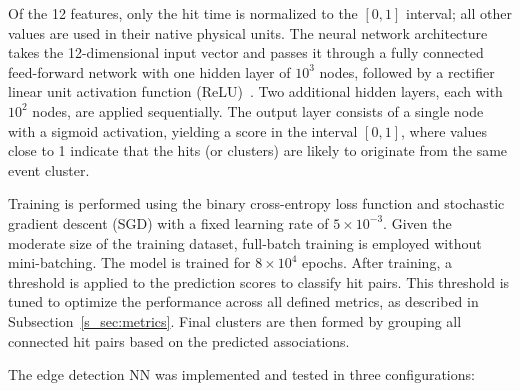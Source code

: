 \documentclass[review,sort&compress]{elsarticle}
\begin{document}
Of the 12 features, only the hit time is normalized to the $[0, 1]$ interval; all other values are used in their native physical units.
The neural network architecture takes the 12-dimensional input vector and passes it through a fully connected feed-forward network with one hidden layer of $10^3$ nodes, followed by a rectifier linear unit activation function (ReLU)~\cite{agarap2018deep}. Two additional hidden layers, each with $10^2$ nodes, are applied sequentially. The output layer consists of a single node with a sigmoid activation, yielding a score in the interval $[0, 1]$, where values close to 1 indicate that the hits (or clusters) are likely to originate from the same event cluster.\newline

Training is performed using the binary cross-entropy loss function \cite{mannor2005cross,de2005tutorial} and stochastic gradient descent (SGD) \cite{newton2018recent} with a fixed learning rate of $5 \times 10^{-3}$. Given the moderate size of the training dataset, full-batch training is employed without mini-batching. The model is trained for $8 \times 10^4$ epochs. After training, a threshold is applied to the prediction scores to classify hit pairs. This threshold is tuned to optimize the performance across all defined metrics, as described in Subsection~\ref{s_sec:metrics}. Final clusters are then formed by grouping all connected hit pairs based on the predicted associations.

The edge detection NN was implemented and tested in three configurations:
\end{document}
